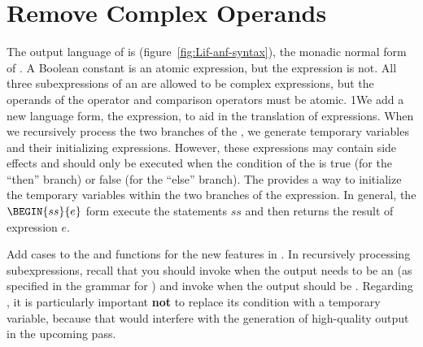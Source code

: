 \documentclass[7x10]{TimesAPriori_MIT}%
\def\pythonEd{1}
\def\edition{0}
\newcommand{\python}[1]{{\if\edition\pythonEd #1\fi}}
\numberwithin{theorem}{chapter}
\numberwithin{definition}{chapter}
\numberwithin{equation}{chapter}
\begin{document}
\section{Remove Complex Operands}
\label{sec:remove-complex-opera-Lif}

The output language of  is
\LangIfANF{} (figure~\ref{fig:Lif-anf-syntax}), the monadic
normal form of \LangIf{}.  A Boolean constant is an atomic expression,
but the  expression is not.  All three subexpressions of an
 are allowed to be complex expressions, but the operands of
the  operator and comparison operators must be atomic.
%
\python{We add a new language form, the  expression, to aid
  in the translation of \code{if} expressions. When we recursively
  process the two branches of the \code{if}, we generate temporary
  variables and their initializing expressions. However, these
  expressions may contain side effects and should only be executed
  when the condition of the \code{if} is true (for the ``then''
  branch) or false (for the ``else'' branch). The \code{Begin} provides
  a way to initialize the temporary variables within the two branches
  of the \code{if} expression.  In general, the $\BEGIN{ss}{e}$
  form execute the statements $ss$ and then returns the result of
  expression $e$.}

Add cases to the  and  functions for
the new features in \LangIf{}. In recursively processing
subexpressions, recall that you should invoke  when
the output needs to be an \Atm{} (as specified in the grammar for
\LangIfANF{}) and invoke  when the output should be
\Exp{}.  Regarding , it is particularly important 
\textbf{not} to replace its condition with a temporary variable, because
that would interfere with the generation of high-quality output in the
upcoming  pass.

\newcommand{\LifMonadASTRacket}{
\begin{array}{rcl}
\Atm &::=& \BOOL{\itm{bool}}\\
\Exp &::=& \UNIOP{\key{not}}{\Atm} 
     \MID \BINOP{\itm{cmp}}{\Atm}{\Atm} 
     \MID \IF{\Exp}{\Exp}{\Exp} 
\end{array}
}
  
\newcommand{\LifMonadASTPython}{
\begin{array}{rcl}
\Atm &::=& \BOOL{\itm{bool}}\\
\Exp &::=& \CMP{\Atm}{\itm{cmp}}{\Atm} \MID \IF{\Exp}{\Exp}{\Exp} \\
  &\MID& \BEGIN{\Stmt^{*}}{\Exp}\\
\Stmt{} &::=& \IFSTMT{\Exp}{\Stmt^{*}}{\Stmt^{*}}
\end{array}
}
\end{document}
